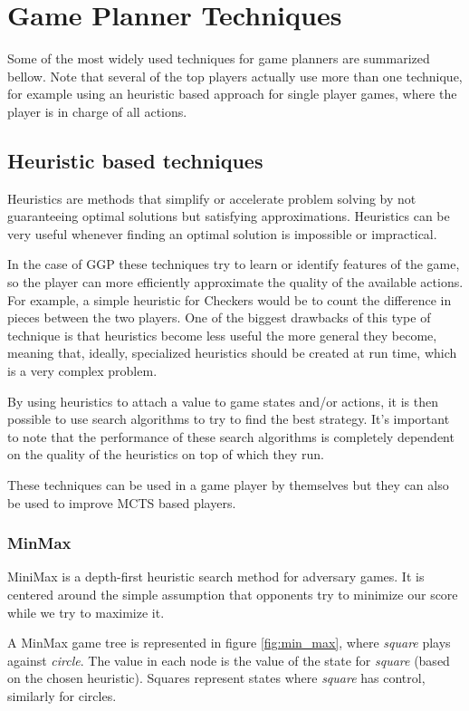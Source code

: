 \section{Game Planner Techniques}

Some of the most widely used techniques for game planners are summarized bellow. Note that several of the top players actually use more than one technique, for example using an heuristic based approach for single player games, where the player is in charge of all actions.


\subsection{Heuristic based techniques}
Heuristics are methods that simplify or accelerate problem solving by not guaranteeing optimal solutions but satisfying approximations. Heuristics can be very useful whenever finding an optimal solution is impossible or impractical.

In the case of \gls{GGP} these techniques try to learn or identify features of the game, so the player can more efficiently approximate the quality of the available actions. For example, a simple heuristic for Checkers would be to count the difference in pieces between the two players. One of the biggest drawbacks of this type of technique is that heuristics become less useful the more general they become, meaning that, ideally, specialized heuristics should be created at run time, which is a very complex problem.

By using heuristics to attach a value to game states and/or actions, it is then possible to use search algorithms to try to find the best strategy.
It's important to note that the performance of these search algorithms is completely dependent on the quality of the heuristics on top of which they run.

These techniques can be used in a game player by themselves but they can also be used to improve \gls{MCTS} based players.

\subsubsection{MinMax}

MiniMax is a depth-first heuristic search method for adversary games.
It is centered around the simple assumption that opponents try to minimize our score while we try to maximize it. 

A MinMax game tree is represented in figure \ref{fig:min_max}, where \textit{square} plays against \textit{circle}. The value in each node is the value of the state for \textit{square} (based on the chosen heuristic). Squares represent states where \textit{square} has control, similarly for circles.

